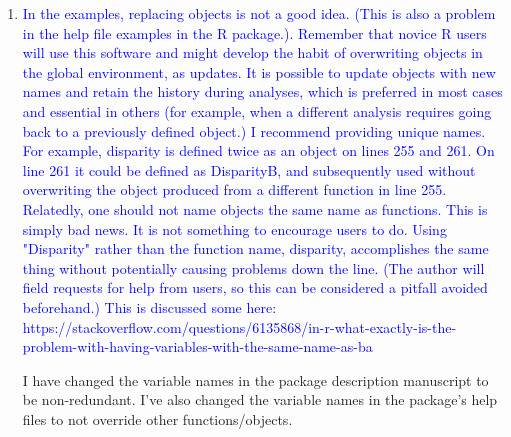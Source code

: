 \documentclass[12pt,letterpaper]{article}
\begin{document}
\begin{enumerate}



\item{\textcolor{blue}{In the examples, replacing objects is not a good idea.  (This is also a problem in the help file examples in the R package.).  Remember that novice R users will use this software and might develop the habit of overwriting objects in the global environment, as updates.  It is possible to update objects with new names and retain the history during analyses, which is preferred in most cases and essential in others (for example, when a different analysis requires going back to a previously defined object.)  I recommend providing unique names.  For example, disparity is defined twice as an object on lines 255 and 261.  On line 261 it could be defined as DisparityB, and subsequently used without overwriting the object produced from a different function in line 255. Relatedly, one should not name objects the same name as functions.  This is simply bad news.  It is not something to encourage users to do.  Using "Disparity" rather than the function name, disparity, accomplishes the same thing without potentially causing problems down the line.  (The author will field requests for help from users, so this can be considered a pitfall avoided beforehand.)  This is discussed some here: https://stackoverflow.com/questions/6135868/in-r-what-exactly-is-the-problem-with-having-variables-with-the-same-name-as-ba}}

I have changed the variable names in the package description manuscript to be non-redundant.
I've also changed the variable names in the package's help files to not override other functions/objects.


\end{enumerate}
\end{document}
